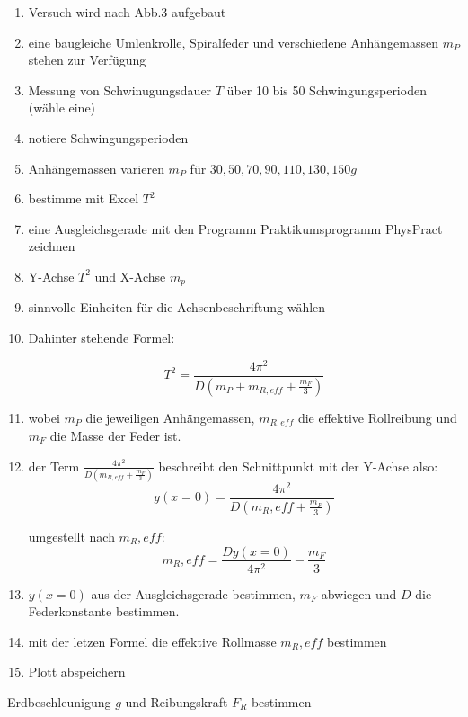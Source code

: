 \documentclass{protokoll}
\begin{document}
\begin{enumerate}

\item Versuch wird nach Abb.3 aufgebaut
\item eine baugleiche Umlenkrolle, Spiralfeder und verschiedene Anhängemassen $m_P$
stehen zur Verfügung
\item Messung von Schwinugungsdauer $T$ über 10 bis 50 Schwingungsperioden (wähle eine)
\item notiere Schwingungsperioden
\item Anhängemassen varieren $m_P$ für $30, 50, 70, 90, 110, 130, 150g$
\item bestimme mit Excel $T^2$
\item eine Ausgleichsgerade mit den Programm Praktikumsprogramm PhysPract zeichnen
\item Y-Achse $T^2$ und X-Achse $m_p$
\item sinnvolle Einheiten für die Achsenbeschriftung wählen
\item Dahinter stehende Formel:

\begin{equation}
 T^2 = \frac{4\pi^2}{D(m_P + m_{R,eff} + \frac{m_F}{3})} 
\end{equation}


\item wobei $m_P$ die jeweiligen Anhängemassen, $m_{R,eff}$ die effektive Rollreibung 
und $m_F$ die Masse der Feder ist.
\item der Term $\frac{4\pi^2}{D(m_{R,eff} + \frac{m_F}{3})}$ beschreibt den Schnittpunkt mit der Y-Achse also:
\begin{equation}
 y(x=0) = \frac{4\pi^2}{D(m_R,eff + \frac{m_F}{3})}
\end{equation}


umgestellt nach $m_R,eff$:
\begin{equation}
 m_R,eff = \frac{D y(x=0)}{4\pi^2} - \frac{m_F}{3} 
\end{equation}


\item $y(x=0)$ aus der Ausgleichsgerade bestimmen, $m_F$ abwiegen und $D$ die Federkonstante bestimmen.
\item mit der letzen Formel die effektive Rollmasse $m_R,eff$ bestimmen
\item Plott abspeichern 

\end{enumerate}


Erdbeschleunigung $g$ und Reibungskraft $F_R$ bestimmen
\end{document}
